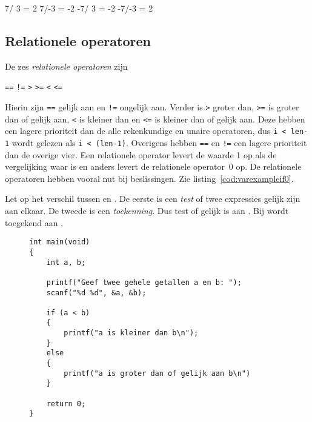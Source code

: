 \begin{dosbox}[title=Uitvoer van het deelprogramma.,label=fig:vardivproblem]
 7/ 3 =  2
 7/-3 = -2
-7/ 3 = -2
-7/-3 =  2
\end{dosbox}

\subsection{Relationele operatoren}
\label{sec:relationeleoperatoren}
De zes \textsl{relationele operatoren} zijn

\hspace*{1em}\texttt{==} \quad \texttt{!=} \quad \texttt{>} \quad \texttt{>=} \quad \texttt{<} \quad \texttt{<=}

\indexop{==}\indexop{>}\indexop{>=}\indexop{<}\indexop{<=}
Hierin zijn \texttt{==} gelijk aan en \texttt{!=} ongelijk aan. Verder is \texttt{>} groter dan, \texttt{>=} is groter dan of gelijk aan, \texttt{<} is kleiner dan en \texttt{<=} is kleiner dan of gelijk aan. Deze hebben een lagere prioriteit dan de alle rekenkundige en unaire operatoren, dus \mbox{\texttt{i < len-1}} wordt gelezen als \texttt{i < (len-1)}. Overigens hebben \texttt{==} en \texttt{!=} een lagere prioriteit dan de overige vier. Een relationele operator levert de waarde 1 op als de vergelijking waar is en anders levert de relationele operator~0 op. De relationele operatoren hebben vooral nut bij beslissingen. Zie listing~\ref{cod:varexampleif0}.

Let op het verschil tussen \lstc{==} en \lstc{=}. De eerste is een \textsl{test} of twee expressies gelijk zijn aan elkaar. De tweede is een \textsl{toekenning}. Dus  test of  gelijk is aan . Bij  wordt  toegekend aan .

\begin{figure}[H]
\begin{lstlisting}[caption=Voorbeeld van een beslissing.,label=cod:varexampleif0]
int main(void)
{
    int a, b;
    
    printf("Geef twee gehele getallen a en b: ");
    scanf("%d %d", &a, &b);

    if (a < b)
    {
        printf("a is kleiner dan b\n");
    }
    else
    {
        printf("a is groter dan of gelijk aan b\n")
    }
    
    return 0;
}
\end{lstlisting}
\end{figure}

